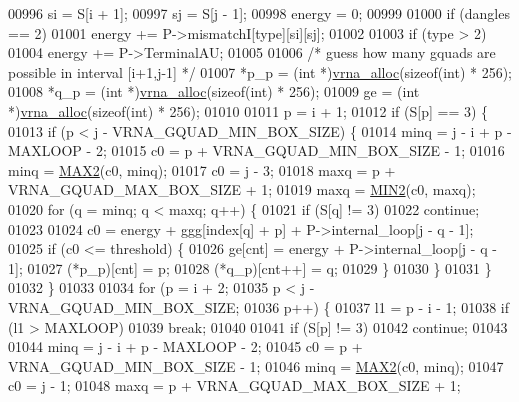 \begin{DoxyCode}
00996   si      = S[i + 1];
00997   sj      = S[j - 1];
00998   energy  = 0;
00999 
01000   \textcolor{keywordflow}{if} (dangles == 2)
01001     energy += P->mismatchI[type][si][sj];
01002 
01003   \textcolor{keywordflow}{if} (type > 2)
01004     energy += P->TerminalAU;
01005 
01006   \textcolor{comment}{/* guess how many gquads are possible in interval [i+1,j-1] */}
01007   *p\_p  = (\textcolor{keywordtype}{int} *)\hyperlink{group__utils_gaf37a0979367c977edfb9da6614eebe99}{vrna\_alloc}(\textcolor{keyword}{sizeof}(\textcolor{keywordtype}{int}) * 256);
01008   *q\_p  = (\textcolor{keywordtype}{int} *)\hyperlink{group__utils_gaf37a0979367c977edfb9da6614eebe99}{vrna\_alloc}(\textcolor{keyword}{sizeof}(\textcolor{keywordtype}{int}) * 256);
01009   ge    = (\textcolor{keywordtype}{int} *)\hyperlink{group__utils_gaf37a0979367c977edfb9da6614eebe99}{vrna\_alloc}(\textcolor{keyword}{sizeof}(\textcolor{keywordtype}{int}) * 256);
01010 
01011   p = i + 1;
01012   \textcolor{keywordflow}{if} (S[p] == 3) \{
01013     \textcolor{keywordflow}{if} (p < j - VRNA\_GQUAD\_MIN\_BOX\_SIZE) \{
01014       minq  = j - i + p - MAXLOOP - 2;
01015       c0    = p + VRNA\_GQUAD\_MIN\_BOX\_SIZE - 1;
01016       minq  = \hyperlink{group__utils_ga33297b3679c713b0c4d897cd0fe3b122}{MAX2}(c0, minq);
01017       c0    = j - 3;
01018       maxq  = p + VRNA\_GQUAD\_MAX\_BOX\_SIZE + 1;
01019       maxq  = \hyperlink{group__utils_gae0b9cd0ce090bd69b951aa73e8fa4f7d}{MIN2}(c0, maxq);
01020       \textcolor{keywordflow}{for} (q = minq; q < maxq; q++) \{
01021         \textcolor{keywordflow}{if} (S[q] != 3)
01022           \textcolor{keywordflow}{continue};
01023 
01024         c0 = energy + ggg[index[q] + p] + P->internal\_loop[j - q - 1];
01025         \textcolor{keywordflow}{if} (c0 <= threshold) \{
01026           ge[cnt]       = energy + P->internal\_loop[j - q - 1];
01027           (*p\_p)[cnt]   = p;
01028           (*q\_p)[cnt++] = q;
01029         \}
01030       \}
01031     \}
01032   \}
01033 
01034   \textcolor{keywordflow}{for} (p = i + 2;
01035        p < j - VRNA\_GQUAD\_MIN\_BOX\_SIZE;
01036        p++) \{
01037     l1 = p - i - 1;
01038     \textcolor{keywordflow}{if} (l1 > MAXLOOP)
01039       \textcolor{keywordflow}{break};
01040 
01041     \textcolor{keywordflow}{if} (S[p] != 3)
01042       \textcolor{keywordflow}{continue};
01043 
01044     minq  = j - i + p - MAXLOOP - 2;
01045     c0    = p + VRNA\_GQUAD\_MIN\_BOX\_SIZE - 1;
01046     minq  = \hyperlink{group__utils_ga33297b3679c713b0c4d897cd0fe3b122}{MAX2}(c0, minq);
01047     c0    = j - 1;
01048     maxq  = p + VRNA\_GQUAD\_MAX\_BOX\_SIZE + 1;

\end{DoxyCode}
